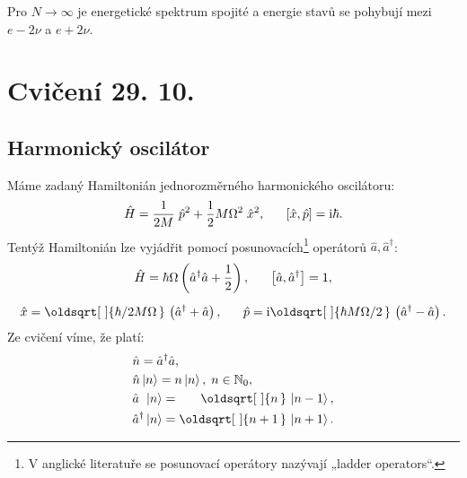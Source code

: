 \documentclass[10pt,a4paper]{article}
\renewcommand*{\sqrt}[2][\ ]{\oldsqrt[#1]{#2\,}\,}
\def\vph{\vphantom}
\def\hph{\hphantom}
\newcommand{\comm}[2]{\left[ #1, #2 \right]}
\newcommand{\const}[1]{\text{\rmfamily\upshape #1}}
\newcommand{\ket}[1]{\left| #1 \right>}
\renewcommand{\i}{\const{i}}
\begin{document}
\noindent Pro $N\to\infty$ je energetické spektrum spojité a energie stavů se pohybují mezi $e-2\nu$ a $e+2\nu$.




\pagebreak

\section{Cvičení 29. 10.}

\subsection{Harmonický oscilátor}
Máme zadaný Hamiltonián jednorozměrného harmonického oscilátoru:
\begin{gather*}
    \hat{H} = \frac{1}{2M} \; \hat{p}^2 + \frac{1}{2} M \Omega^2 \; \hat{x}^2,
    \;\;\;\;\;\;
    \comm{\hat{x}}{\hat{p}} = \i \hbar.
\end{gather*}
Tentýž Hamiltonián lze vyjádřit pomocí posunovacích\footnote{V anglické literatuře se posunovací operátory nazývají „ladder operators“.} operátorů $\hat{a}, \hat{a}^\dagger$:
\begin{gather*}
    \hat{H} = \hbar \Omega \left(
        \hat{a}^\dagger \hat{a} + \frac{1}{2}
    \right),
    \;\;\;\;\;\;
    \comm{\hat{a}}{\hat{a}^\dagger} = 1,
    \\[5pt]
    \hat{x} = \sqrt{\hbar / 2 M \Omega}
    \left( \hat{a}^\dagger + \hat{a} \right),
    \;\;\;\;\;\;
    \hat{p} = \i \sqrt{\hbar M \Omega / 2}
    \left( \hat{a}^\dagger - \hat{a} \right).
\end{gather*}
Ze cvičení víme, že platí:
\begin{align*}
    &\hat{n} = \hat{a}^\dagger \hat{a},
    \\
    &\hat{n} \ket{n} = n \ket{n}, \; n \in \mathbb{N}_0,
    \\
    &\hat{a} \hph{\vph{\hat{a}}^\dagger} \ket{n} = \hph{\vph{n}+1} \sqrt{n} \ket{n-1},
    \\
    &\hat{a}^\dagger \ket{n} = \sqrt{n+1} \ket{n+1}.
\end{align*}
\end{document}
